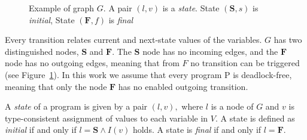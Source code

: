 \begin{figure}[ht]
  \begin{mdframed}
  \vspace{1cm}
  \centering
  \vspace{1cm}
  \end{mdframed}
  \caption[Example of graph $G$]{Example of graph $G$. A pair $(l,v)$ is a \emph{state}. State $(\textbf{S},s)$ is \emph{initial}, State $(\textbf{F},f)$ is \emph{final}}
  \label{fig:programcfg}
\end{figure}

Every transition relates current and next-state values of the variables. $G$ has two distinguished nodes, $\textbf{S}$ and $\textbf{F}$. The $\textbf{S}$ node has no incoming edges, and the $\textbf{F}$ node has no outgoing edges, meaning that from $F$ no transition can be triggered (see Figure~\ref{fig:programcfg}). In this work we assume that every program P is deadlock-free, meaning that only the node $\textbf{F}$ has no enabled outgoing transition.

A \emph{state} of a program is given by a pair $(l, v),$ where $l$ is a node of $G$ and $v$ is type-consistent assignment of values to each variable in $V$. A state is defined as \emph{initial} if and only if $ l = \textbf{S} \land I(v)$ holds.
A state is \emph{final} if and only if $ l = \textbf{F}$.

